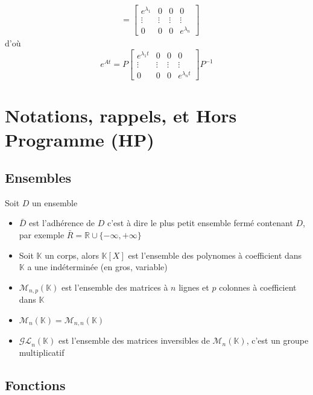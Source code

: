 \documentclass[11pt,colorlinks]{book}
\theoremstyle{mytheoremstyle}
\theoremstyle{mytheoremstyle}
\theoremstyle{mytheoremstyle}
\theoremstyle{mytheoremstyle}
\theoremstyle{mytheoremstyle}
\theoremstyle{mytheoremstyle}
\theoremstyle{mytheoremstyle}
\theoremstyle{mytheoremstyle}
\theoremstyle{myproblemstyle}
\def\mbb#1{\mathbb{#1}}
\def\mfc#1{\mathcal{#1}}
\def\bR{\mbb{R}}
\def\bK{\mbb{K}}
\begin{document}
\begin{definition}
\begin{align*}
    &= \begin{bmatrix}
      e^{\lambda_1} & 0 & 0 & 0 \\ 
      \vdots & \vdots & \vdots & \vdots \\ 
      0 & 0 & 0 & e^{\lambda_n}
    \end{bmatrix}
  \end{align*}
  d'où
  \begin{equation*}
    e^{At} = P\begin{bmatrix}
      e^{\lambda_1 t} & 0 & 0 & 0 \\ 
      \vdots & \vdots & \vdots & \vdots \\ 
      0 & 0 & 0 & e^{\lambda_n t}
    \end{bmatrix}P^{-1}
  \end{equation*}
\end{definition}

\chapter{Notations, rappels, et Hors Programme (HP)}
\section{Ensembles}
\begin{rmq}
  Soit $D$ un ensemble
  \begin{itemize}
    \item $\bar{D}$ est l'adhérence de $D$ c'est à dire le plus 
    petit ensemble fermé contenant $D$, par exemple $\bar{R} = \bR \cup \{-\infty,+\infty\}$
    \item Soit $\bK$ un corps, alors $\bK[X]$ est l'ensemble des polynomes 
    à coefficient dans $\bK$ a une indéterminée (en gros, variable)
    \item $\mfc{M}_{n,p}(\bK)$ est l'ensemble des matrices à $n$ lignes et $p$ colonnes à coefficient dans $\bK$
    \item $\mfc{M}_{n}(\bK) = \mfc{M}_{n,n}(\bK)$
    \item $\mfc{GL}_n(\bK)$ est l'ensemble des matrices inversibles de $\mfc{M}_n(\bK)$, c'est un groupe multiplicatif
  \end{itemize}
\end{rmq}
\section{Fonctions}
\end{document}

